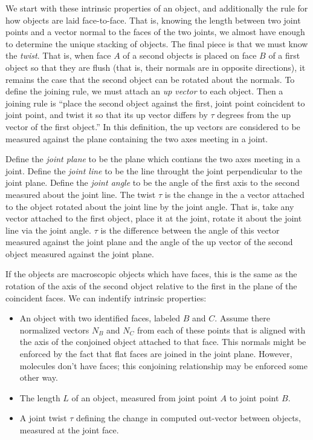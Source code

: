 \documentclass[11pt]{article}
\begin{document}
{We start with these intrinsic properties of an object, and additionally the
rule for how objects are laid face-to-face. That is, knowing the length between two
joint points and a vector normal to the faces of the two joints, we almost have
enough to determine the unique stacking of objects. The final piece is that we must
know the {\em twist}. That is, when face $A$ of a second objects is placed on face $B$
of a first object so that they are flush (that is, their normals are in opposite directions),
it remains the case that the second object can be rotated about the normals. To
define the joining rule, we must attach an {\em up vector} to each object. Then a joining
rule is ``place the second object against the first, joint point coincident to joint point,
and twist it so that its up vector differs by $\tau$ degrees from the up vector of the first
object.'' In this definition, the up vectors are considered to be measured against the plane
containing the two axes meeting in a joint.

Define the {\em joint plane} to be the plane which contians the two axes meeting in a joint.
Define the {\em joint line} to be the line throught the joint perpendicular to the joint plane.
Define the {\em joint angle} to be the angle of the first axis to the second measured about
the joint line.
The twist $\tau$ is the change in the a vector attached to the object rotated about the joint
line by the joint angle. That is, take any vector attached to the first object, place it at
the joint, rotate it about the joint line via the joint angle. $\tau$ is the difference
between the angle of this vector measured against the joint plane and the angle of the
up vector of the second object measured against the joint plane.

If the objects are macroscopic objects which have faces, this is the same as the rotation
of the axis of the second object relative to the first in the plane of the coincident faces.
We can indentify intrinsic properties:

\begin{itemize}
\item An object with two identified faces, labeled $B$ and $C$. Assume there normalized
  vectors $N_B$ and $N_C$
  from each of these points that is aligned with the axis of the conjoined object attached to
  that face. This normals might be enforced by the fact that flat faces are joined in the joint plane.
  However, molecules don't have faces; this conjoining relationship may be enforced some other way.
\item The length $L$ of an object, measured from joint point $A$ to joint point $B$.
\item A joint twist $\tau$ defining the change in computed out-vector between objects,
  measured at the joint face.
\end{itemize}

}
\end{document}

